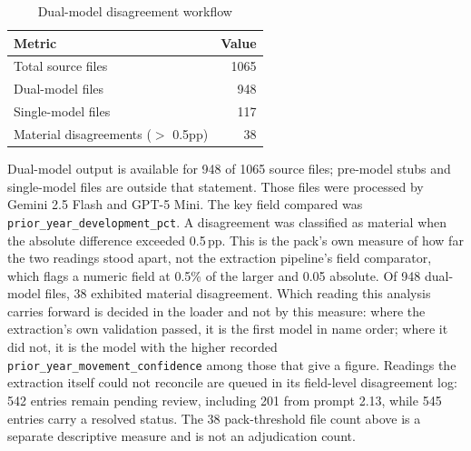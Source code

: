 \begin{table}[htbp]
\centering
\caption{Dual-model disagreement workflow}
\label{tab:dual_model}
\begin{tabular}{lr}
\toprule
\textbf{Metric} & \textbf{Value} \\
\midrule
Total source files & 1065 \\
Dual-model files & 948 \\
Single-model files & 117 \\
Material disagreements ($>$ 0.5pp) & 38 \\
\bottomrule
\end{tabular}
\smallskip

\begin{minipage}{0.9\textwidth}\small
Dual-model output is available for 948 of 1065 source files; pre-model stubs and single-model files are outside that statement. Those files were processed by Gemini 2.5 Flash and GPT-5 Mini. The key field compared was \texttt{prior\_year\_development\_pct}. A disagreement was classified as material when the absolute difference exceeded 0.5\,pp. This is the pack's own measure of how far the two readings stood apart, not the extraction pipeline's field comparator, which flags a numeric field at 0.5\% of the larger and 0.05 absolute. Of 948 dual-model files, 38 exhibited material disagreement. Which reading this analysis carries forward is decided in the loader and not by this measure: where the extraction's own validation passed, it is the first model in name order; where it did not, it is the model with the higher recorded \texttt{prior\_year\_movement\_confidence} among those that give a figure. Readings the extraction itself could not reconcile are queued in its field-level disagreement log: 542 entries remain pending review, including 201 from prompt 2.13, while 545 entries carry a resolved status. The 38 pack-threshold file count above is a separate descriptive measure and is not an adjudication count.
\end{minipage}
\end{table}
